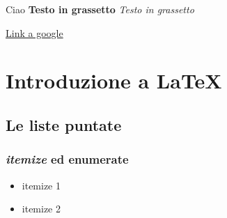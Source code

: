 \documentclass[]{article}
\begin{document}
    Ciao 
    \textbf{Testo in grassetto}
    \textit{Testo in grassetto}

    \href{www.google.it}{Link a google}

    \tableofcontents

    \newpage
    
    \section{Introduzione a LaTeX}
    \subsection{Le liste puntate}

    \subsubsection{\textit{itemize} ed \textbf{enumerate}}

    \begin{itemize} \label{sec:itemize} %
        \item itemize 1
        \item itemize 2
    \end{itemize}
\end{document}
